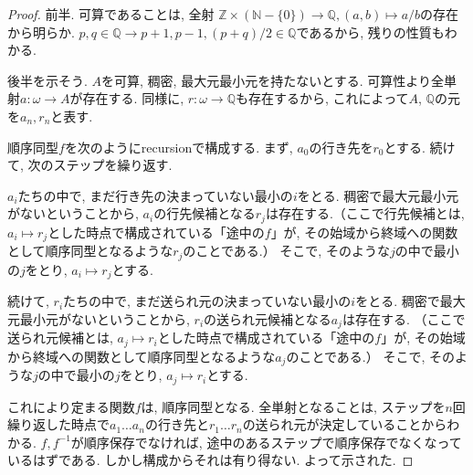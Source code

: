 \documentclass[a4paper, twoside]{bxjsarticle}
\newcommand{\nat}{\mathbb{N}}
\newcommand{\zah}{\mathbb{Z}}
\newcommand{\quo}{\mathbb{Q}}
\theoremstyle{definition}
\begin{document}
        \begin{proof}
            前半. 可算であることは, 全射 $\zah\times(\nat-\{0\})\to\quo, (a, b)\mapsto a/b$の存在から明らか. $p, q\in\quo\to p+1, p-1, (p+q)/2\in\quo$であるから, 残りの性質もわかる.
            
            後半を示そう. $A$を可算, 稠密, 最大元最小元を持たないとする. 可算性より全単射$a\colon \omega\to A$が存在する. 同様に, $r\colon \omega\to \quo$も存在するから, これによって$A$, $\quo$の元を$a_n, r_n$と表す.
            
            順序同型$f$を次のようにrecursionで構成する. まず, $a_0$の行き先を$r_0$とする. 続けて, 次のステップを繰り返す.
            \begin{framed}
                $a_i$たちの中で, まだ行き先の決まっていない最小の$i$をとる. 稠密で最大元最小元がないということから, $a_i$の行先候補となる$r_j$は存在する.（ここで行先候補とは, $a_i\mapsto r_j$とした時点で構成されている「途中の$f$」が, その始域から終域への関数として順序同型となるような$r_j$のことである.） そこで, そのような$j$の中で最小の$j$をとり, $a_i\mapsto r_j$とする. 
                
                続けて, $r_i$たちの中で, まだ送られ元の決まっていない最小の$i$をとる. 稠密で最大元最小元がないということから, $r_i$の送られ元候補となる$a_j$は存在する. （ここで送られ元候補とは, $a_j\mapsto r_i$とした時点で構成されている「途中の$f$」が, その始域から終域への関数として順序同型となるような$a_j$のことである.） そこで, そのような$j$の中で最小の$j$をとり, $a_j\mapsto r_i$とする. 
            \end{framed}
            これにより定まる関数$f$は, 順序同型となる. 全単射となることは, ステップを$n$回繰り返した時点で$a_1\dots a_n$の行き先と$r_1\dots r_n$の送られ元が決定していることからわかる. $f, f^{-1}$が順序保存でなければ, 途中のあるステップで順序保存でなくなっているはずである. しかし構成からそれは有り得ない. よって示された.
        \end{proof}
        
\end{document}
